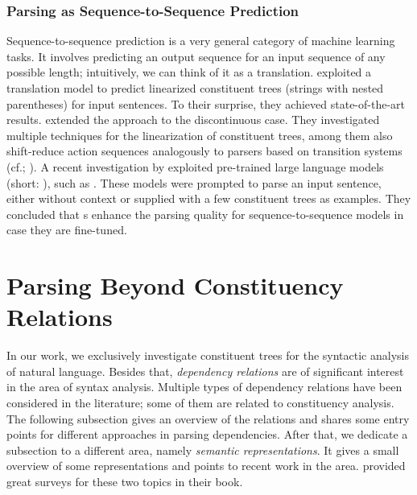 \documentclass[../document.tex]{subfiles}
\begin{document}
    \subsubsection*{Parsing as Sequence-to-Sequence Prediction}
    Sequence-to-sequence prediction is a very general category of machine learning tasks.
    It involves predicting an output sequence for an input sequence of any possible length; intuitively, we can think of it as a translation.
     exploited a translation model to predict linearized constituent trees (strings with nested parentheses) for input sentences.
    To their surprise, they achieved state-of-the-art results.
     extended the approach to the discontinuous case.
    They investigated multiple techniques for the linearization of constituent trees, among them also shift-reduce action sequences analogously to parsers based on transition systems (cf.\@ \citealp{Ma2017DeterministicAF}; \citealp{liu-zhang-2017-encoder}).
    A recent investigation by \citet{bai2023constituency} exploited pre-trained large language models (short: ), such as  \citep{openai2023gpt4}.
    These models were prompted to parse an input sentence, either without context or supplied with a few constituent trees as examples.
    They concluded that s enhance the parsing quality for sequence-to-sequence models in case they are fine-tuned.

    \section{Parsing Beyond Constituency Relations}\label{sec:literature:beyond}
    In our work, we exclusively investigate constituent trees for the syntactic analysis of natural language.
    Besides that, \emph{dependency relations} are of significant interest in the area of syntax analysis.
    Multiple types of dependency relations have been considered in the literature; some of them are related to constituency analysis.
    The following subsection gives an overview of the relations and shares some entry points for different approaches in parsing dependencies.
    After that, we dedicate a subsection to a different area, namely \emph{semantic representations}.
    It gives a small overview of some representations and points to recent work in the area.
     provided great surveys for these two topics in their book.
\end{document}
